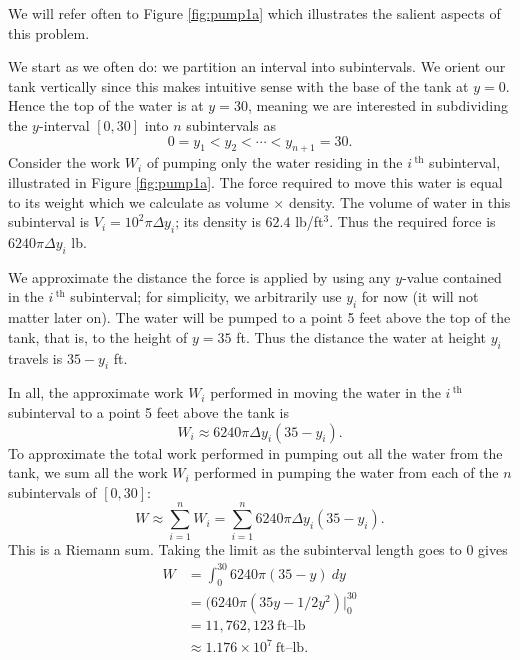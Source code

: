 {We will refer often to Figure \ref{fig:pump1a} which illustrates the salient aspects of this problem.

We start as we often do: we partition an interval into subintervals. We orient our tank vertically since this makes intuitive sense with the base of the tank at $y=0$. Hence the top of the water is at $y=30$, meaning we are interested in subdividing the $y$-interval $[0,30]$ into $n$ subintervals as 
\[
0 = y_1 < y_2 < \cdots < y_{n+1} = 30.
\]
Consider the work $W_i$ of pumping only the water residing in the $i\,^\text{th}$ subinterval, illustrated in Figure \ref{fig:pump1a}. The force required to move this water is equal to its weight which we calculate as volume $\times $ density. The volume of water in this subinterval is 
$V_i = 10^2\pi \Delta y_i$; its density is $62.4$ lb/ft$^3$. Thus the required force is $6240\pi\Delta y_i$ lb.

We approximate the distance the force is applied by using any $y$-value contained in the $i\,^\text{th}$ subinterval; for simplicity, we arbitrarily use $y_i$ for now (it will not matter later on). The water will be pumped to a point 5 feet above the top of the tank, that is, to the height of $y=35$ ft. Thus the distance the water at height $y_i$ travels is $35-y_i$ ft. 

In all, the approximate work $W_i$ performed in moving the water in the $i\,^\text{th}$ subinterval to a point 5 feet above the tank is 
\[
W_i \approx 6240\pi\Delta y_i(35-y_i).
\]
To approximate the total work performed in pumping out all the water from the tank, we sum all the work $W_i$ performed in pumping the water from each of the $n$ subintervals of $[0,30]$:
\[
W \approx \sum_{i=1}^n W_i = \sum_{i=1}^n 6240\pi\Delta y_i(35-y_i).
\]
This is a Riemann sum. Taking the limit as the subinterval length goes to 0 gives 
\begin{align*}
W 	&=	\int_0^{30} 6240\pi(35-y)\ dy \\
		&=  (6240\pi\left(35y-1/2y^2\right)\Big|_0^{30} \\
		&= 	11,762,123 \ \text{ft--lb}\\
		&\approx  1.176 \times 10^7 \ \text{ft--lb}.
\end{align*}
\baselineskip
}\\
\clearpage

